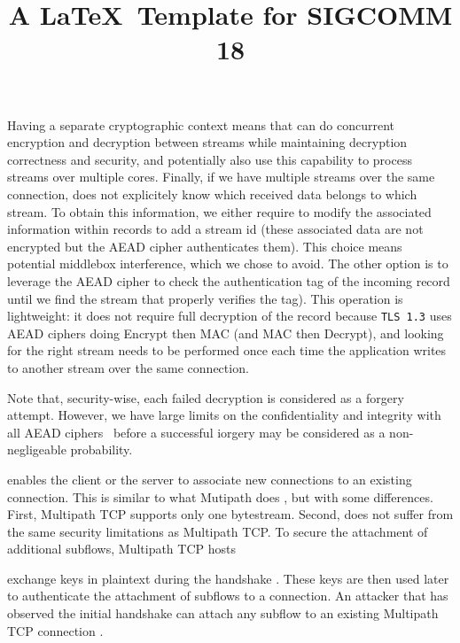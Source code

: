 Having a separate cryptographic
context means that \tcpls can do concurrent encryption and decryption
between streams while maintaining decryption correctness and security, and potentially also use this
capability to process streams over multiple cores. Finally, if we have multiple
streams over the same \tcp connection, \tcpls does not explicitely know which received data belongs to
which stream. To obtain this information, we either require to modify the
associated information within  \tls records to add a stream id (these associated
data are not encrypted but the AEAD cipher authenticates them). This
choice means potential middlebox interference, which we chose to avoid. The other option
is to leverage the AEAD cipher to check the authentication tag of the incoming
record until we find the stream that properly verifies the tag). This operation is
lightweight: it does not require full decryption of the record because
\texttt{TLS 1.3}
uses AEAD ciphers doing Encrypt then MAC (and MAC then
Decrypt), and looking for the right stream needs to be performed once each time
the application writes to another stream over the same \tcp connection.

Note that, security-wise, each failed decryption is considered as a
forgery attempt. However, we have large limits on the confidentiality and
integrity with all AEAD ciphers~\cite{luykx2015limits, aeadlimits} before a
successful iorgery may be considered as a non-negligeable probability.


\tcpls enables the client
or the server to associate new \tcp connections to an existing \tcpls
connection. This is similar to what Mutipath \tcp does \cite{raiciu2012hard,rfc6824},
but with some differences. First, Multipath TCP supports only one bytestream.
Second, \tcpls does not suffer from the same security limitations as Multipath
TCP. To secure the attachment of additional subflows, Multipath TCP hosts
\title{A \LaTeX\ Template for SIGCOMM 18}
exchange keys in plaintext during the handshake \cite{rfc6824, rfc8684}.
These keys are
then used later to authenticate the attachment of subflows to a connection. An
attacker that has observed the initial handshake can attach any subflow to an
existing Multipath TCP connection \cite{rfc6181}.

